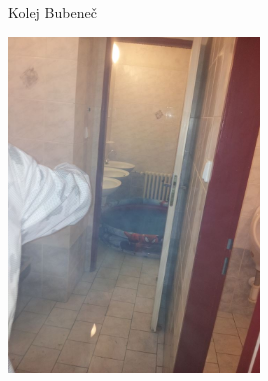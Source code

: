 \documentclass{beamer}
\begin{document}
\begin{frame}{Kolej Bubeneč}
	\begin{center}
		\includegraphics[width=0.5\textwidth]{bazenek.jpg}
	\end{center}
\end{frame}
\end{document}
